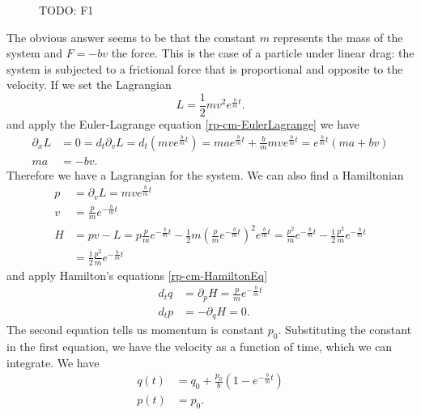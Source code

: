 \begin{figure}
	\centering
	\begin{tikzpicture}
	\end{tikzpicture}
	\caption {TODO: F1}
\end{figure}

The obvious answer seems to be that the constant $m$ represents the mass of the system and $F = -bv$ the force. This is the case of a particle under linear drag:  the system is subjected to a frictional force that is proportional and opposite to the velocity. If we set the Lagrangian
\begin{equation}\label{rp-cm-frictionLagrangian}
	L = \frac{1}{2} m v^2 e^{\frac{b}{m}t}.
\end{equation}
and apply the Euler-Lagrange equation \ref{rp-cm-EulerLagrange} we have
\begin{equation}
	\begin{aligned}
	\partial_x L &= 0 = d_t \partial_v L = d_t \left(m v e^{\frac{b}{m}t} \right)=mae^{\frac{b}{m}t} + \frac{b}{m} m v e^{\frac{b}{m}t} = e^{\frac{b}{m}t}(ma + bv) \\
	ma &= - bv.
	\end{aligned}
\end{equation}
Therefore we have a Lagrangian for the system. We can also find a Hamiltonian
\begin{equation}\label{rp-cm-kd-momentumHamiltonian}
	\begin{aligned}
	p &= \partial_v L = m v e^{\frac{b}{m}t} \\
		v &= \frac{p}{m} e^{-\frac{b}{m}t} \\
		H &= p v - L = p \frac{p}{m} e^{-\frac{b}{m}t} - \frac{1}{2} m \left( \frac{p}{m} e^{-\frac{b}{m}t} \right)^2 e^{\frac{b}{m}t} = \frac{p^2}{m}  e^{-\frac{b}{m}t} - \frac{1}{2} \frac{p^2}{m}  e^{-\frac{b}{m}t} \\ 
		&=\frac{1}{2} \frac{p^2}{m}  e^{-\frac{b}{m}t}
	\end{aligned}
\end{equation}
and apply Hamilton's equations \ref{rp-cm-HamiltonEq}
\begin{equation}
	\begin{aligned}
		d_t q &= \partial_p H = \frac{p}{m}  e^{-\frac{b}{m}t} \\
		d_t p &= - \partial_q H = 0. 
	\end{aligned}
\end{equation}
The second equation tells us momentum is constant $p_0$. Substituting the constant in the first equation, we have the velocity as a function of time, which we can integrate. We have
\begin{equation}
	\begin{aligned}
	q(t) &= q_0 + \frac{p_0}{b} \left( 1 - e^{-\frac{b}{m}t}\right) \\
	p(t) &= p_0.
	\end{aligned}
\end{equation}

